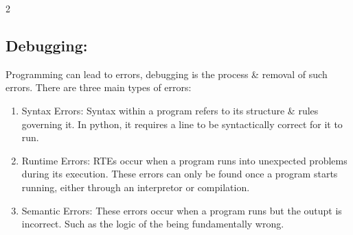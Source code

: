 \documentclass[a4paper]{report}
\begin{document}
\begin{flushleft}
\begin{multicols}{2}
	\subsection*{Debugging:}
	Programming can lead to errors, debugging is the process \& removal of such errors. There are three main types of errors:
	\begin{enumerate}
		\item Syntax Errors: Syntax within a program refers to its structure \& rules governing it. In python, it requires a line to be syntactically correct for it to run.
		\item Runtime Errors: RTEs occur when a program runs into unexpected problems during its execution. These errors can only be found once a program starts running, either through an interpretor or compilation.
		\item Semantic Errors: These errors occur when a program runs but the outupt is incorrect. Such as the logic of the being fundamentally wrong.
	\end{enumerate}
	

\end{multicols}
\end{flushleft}
\end{document}

